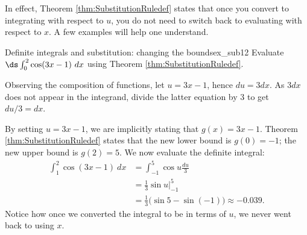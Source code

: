 In effect, Theorem \ref{thm:SubstitutionRuledef} states that once you convert to integrating with respect to $u$, you do not need to switch back to evaluating with respect to $x$. A few examples will help one understand.\\

\begin{example}{Definite integrals and substitution: changing the bounds}{ex_sub12}
{
Evaluate $\ds\int_0^2 \cos(3x-1)\ dx$ using Theorem \ref{thm:SubstitutionRuledef}.}
\end{example}

\begin{solution}
{Observing the composition of functions, let $u=3x-1$, hence $du = 3dx$. As $3dx$ does not appear in the integrand, divide the latter equation by 3 to get $du/3 = dx$. 

By setting $u = 3x-1$, we are implicitly stating that $g(x) = 3x-1$. Theorem \ref{thm:SubstitutionRuledef} states that the new lower bound is $g(0) = -1$; the new upper bound is $g(2) = 5$. We now evaluate the definite integral:
\begin{align*}
\int_1^2 \cos(3x-1) \ dx &=	\int_{-1}^5 \cos u \frac{du}{3} \\
								&= \frac{1}{3} \sin u\Big|_{-1}^5 \\
								&= \frac{1}{3}\big(\sin 5- \sin (-1)\big)\approx -0.039.
\end{align*}
Notice how once we converted the integral to be in terms of $u$, we never went back to using $x$.




}
\end{solution}
